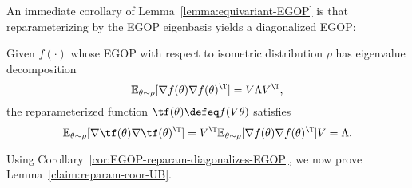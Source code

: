 An immediate corollary of Lemma~\ref{lemma:equivariant-EGOP} is that reparameterizing by the EGOP eigenbasis yields a diagonalized EGOP:

\begin{corollary}\label{cor:EGOP-reparam-diagonalizes-EGOP}
    Given $f(\cdot)$ whose EGOP with respect to isometric distribution $\rho$ has eigenvalue decomposition
    \[
        \mathbb{E}_{\theta\sim \rho}[\nabla f(\theta)\nabla f(\theta)^\T] = V \Lambda V^\T, 
    \]
    the reparameterized function $\tf(\theta)\defeq f(V\theta)$ satisfies
    \[
        \mathbb{E}_{\theta\sim \rho}[\nabla \tf(\theta)\nabla \tf(\theta)^\T] = V^\T \mathbb{E}_{\theta\sim \rho}[\nabla f(\theta)\nabla f(\theta)^\T]V = \Lambda.
    \]
\end{corollary}

Using Corollary~\ref{cor:EGOP-reparam-diagonalizes-EGOP}, we now prove Lemma~\ref{claim:reparam-coor-UB}.

